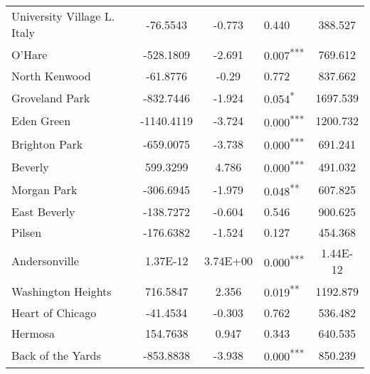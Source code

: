\documentclass[12pt]{report}
\begin{document}
\begin{longtable}{l S[table-format=6.4] S[table-format=3.4] l S[table-format=4.4]}
	University Village L. Italy  & -76.5543             & -0.773           & 0.440                      & 388.527                           \\
	O'Hare                       & -528.1809            & -2.691           & 0.007\textsuperscript{***} & 769.612                           \\
	North Kenwood                & -61.8776             & -0.29            & 0.772                      & 837.662                           \\
	Groveland Park               & -832.7446            & -1.924           & 0.054\textsuperscript{*}   & 1697.539                          \\
	Eden Green                   & -1140.4119           & -3.724           & 0.000\textsuperscript{***} & 1200.732                          \\
	Brighton Park                & -659.0075            & -3.738           & 0.000\textsuperscript{***} & 691.241                           \\
	Beverly                      & 599.3299             & 4.786            & 0.000\textsuperscript{***} & 491.032                           \\
	Morgan Park                  & -306.6945            & -1.979           & 0.048\textsuperscript{**}  & 607.825                           \\
	East Beverly                 & -138.7272            & -0.604           & 0.546                      & 900.625                           \\
	Pilsen                       & -176.6382            & -1.524           & 0.127                      & 454.368                           \\
	Andersonville                & 1.37E-12             & 3.74E+00         & 0.000\textsuperscript{***} & 1.44E-12                          \\
	Washington Heights           & 716.5847             & 2.356            & 0.019\textsuperscript{**}  & 1192.879                          \\
	Heart of Chicago             & -41.4534             & -0.303           & 0.762                      & 536.482                           \\
	Hermosa                      & 154.7638             & 0.947            & 0.343                      & 640.535                           \\
	Back of the Yards            & -853.8838            & -3.938           & 0.000\textsuperscript{***} & 850.239                           \\

\end{longtable}
\end{document}
